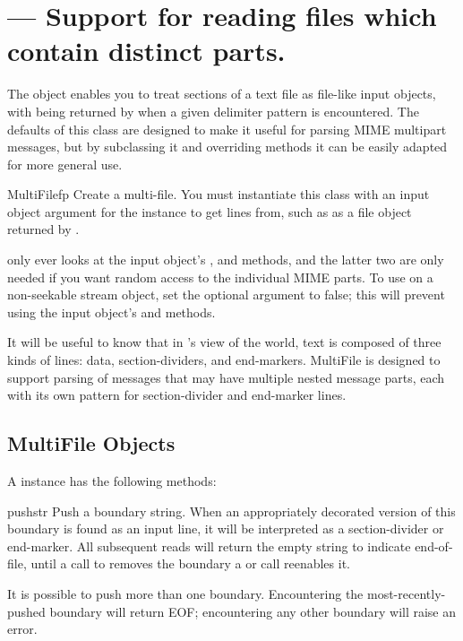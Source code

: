 \section{ ---
         Support for reading files which contain distinct parts.}



The  object enables you to treat sections of a text
file as file-like input objects, with  being returned by
 when a given delimiter pattern is encountered.  The
defaults of this class are designed to make it useful for parsing
MIME multipart messages, but by subclassing it and overriding methods 
it can be easily adapted for more general use.

\begin{classdesc}{MultiFile}{fp}
Create a multi-file.  You must instantiate this class with an input
object argument for the  instance to get lines from,
such as as a file object returned by .

 only ever looks at the input object's
,  and  methods, and
the latter two are only needed if you want random access to the
individual MIME parts. To use  on a non-seekable
stream object, set the optional  argument to false; this
will prevent using the input object's  and
 methods.
\end{classdesc}

It will be useful to know that in 's view of the world, text
is composed of three kinds of lines: data, section-dividers, and
end-markers.  MultiFile is designed to support parsing of
messages that may have multiple nested message parts, each with its
own pattern for section-divider and end-marker lines.


\subsection{MultiFile Objects \label{MultiFile-objects}}

A  instance has the following methods:

\begin{methoddesc}{push}{str}
Push a boundary string.  When an appropriately decorated version of
this boundary is found as an input line, it will be interpreted as a
section-divider or end-marker.  All subsequent
reads will return the empty string to indicate end-of-file, until a
call to  removes the boundary a or  call
reenables it.

It is possible to push more than one boundary.  Encountering the
most-recently-pushed boundary will return EOF; encountering any other
boundary will raise an error.
\end{methoddesc}

